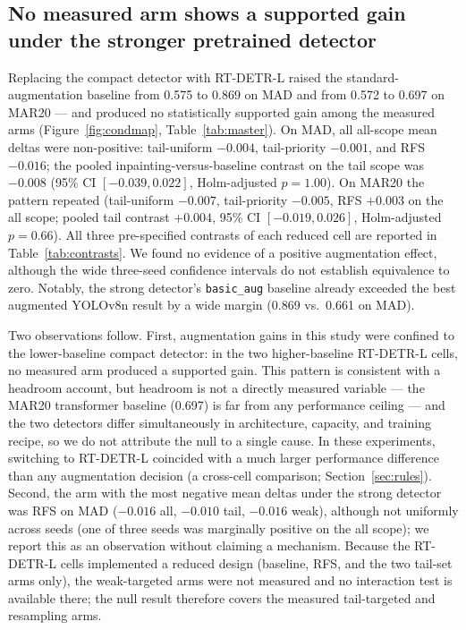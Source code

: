 \documentclass[preprint,12pt,authoryear]{elsarticle}
\begin{document}
\subsection{No measured arm shows a supported gain under the stronger pretrained detector}\label{sec:r2}

Replacing the compact detector with RT-DETR-L raised the
standard-augmentation baseline from 0.575 to 0.869 on MAD and from
0.572 to 0.697 on MAR20 --- and produced no statistically supported
gain among the measured arms (Figure~\ref{fig:condmap},
Table~\ref{tab:master}). On MAD, all all-scope mean deltas were
non-positive: tail-uniform $-0.004$, tail-priority $-0.001$, and RFS
$-0.016$; the pooled inpainting-versus-baseline contrast on the tail
scope was $-0.008$ (95\% CI $[-0.039, 0.022]$, Holm-adjusted
$p = 1.00$). On MAR20 the pattern repeated (tail-uniform $-0.007$,
tail-priority $-0.005$, RFS $+0.003$ on the all scope; pooled tail
contrast $+0.004$, 95\% CI $[-0.019, 0.026]$, Holm-adjusted $p = 0.66$). All three pre-specified contrasts of each
reduced cell are reported in Table~\ref{tab:contrasts}. We found no
evidence of a positive augmentation effect,
although the wide three-seed confidence intervals do not establish
equivalence to zero. Notably, the strong detector's \texttt{basic\_aug}
baseline already exceeded the best augmented YOLOv8n result by a wide
margin (0.869 vs.\ 0.661 on MAD).

Two observations follow. First, augmentation gains in this study were
confined to the lower-baseline compact detector: in the two
higher-baseline RT-DETR-L cells, no measured arm produced a supported
gain. This pattern is consistent with a headroom account, but headroom
is not a directly measured variable --- the MAR20 transformer baseline
(0.697) is far from any performance ceiling --- and the two detectors
differ simultaneously in architecture, capacity, and training recipe,
so we do not attribute the null to a single cause. In these
experiments, switching to RT-DETR-L coincided with a much larger
performance difference than any augmentation decision (a cross-cell
comparison; Section~\ref{sec:rules}). Second, the arm with the most
negative mean deltas under the strong detector was RFS on MAD
($-0.016$ all, $-0.010$ tail, $-0.016$ weak), although not uniformly
across seeds (one of three seeds was marginally positive on the all
scope); we report this as an observation without claiming a mechanism.
Because the RT-DETR-L cells implemented a reduced design (baseline,
RFS, and the two tail-set arms only), the weak-targeted arms were not
measured and no interaction test is available there; the null result
therefore covers the measured tail-targeted and resampling arms.
\end{document}

